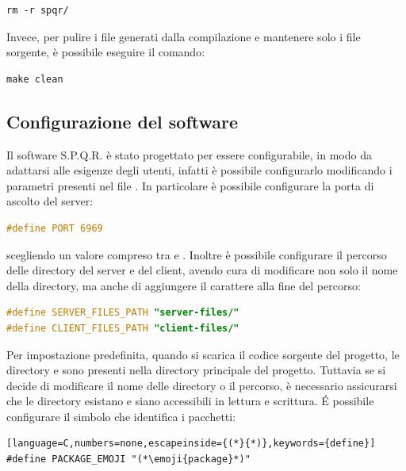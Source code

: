 \begin{lstlisting}[numbers=none]
rm -r spqr/
\end{lstlisting}

Invece, per pulire i file generati dalla compilazione e mantenere solo i file sorgente, è possibile eseguire il comando:

\begin{lstlisting}[numbers=none]
make clean
\end{lstlisting}

\subsection{Configurazione del software}
Il software S.P.Q.R. è stato progettato per essere configurabile, in modo da adattarsi alle esigenze degli utenti, infatti è possibile configurarlo modificando i parametri presenti nel file .
In particolare è possibile configurare la porta di ascolto del server:

\begin{lstlisting}[language=C,numbers=none,keywords={define}]
#define PORT 6969
\end{lstlisting}

scegliendo un valore compreso tra  e .
Inoltre è possibile configurare il percorso delle directory del server e del client, avendo cura di modificare non solo il nome della directory, ma anche di aggiungere il carattere \lstinlinebg{/} alla fine del percorso:

\begin{lstlisting}[language=C,numbers=none,keywords={define}]
#define SERVER_FILES_PATH "server-files/"
#define CLIENT_FILES_PATH "client-files/"
\end{lstlisting}

Per impostazione predefinita, quando si scarica il codice sorgente del progetto, le directory  e  sono presenti nella directory principale del progetto.
Tuttavia se si decide di modificare il nome delle directory o il percorso, è necessario assicurarsi che le directory esistano e siano accessibili in lettura e scrittura.
\'E possibile configurare il simbolo che identifica i pacchetti:

\begin{lstlisting}[language=C,numbers=none,escapeinside={(*}{*)},keywords={define}]
#define PACKAGE_EMOJI "(*\emoji{package}*)"
\end{lstlisting}

